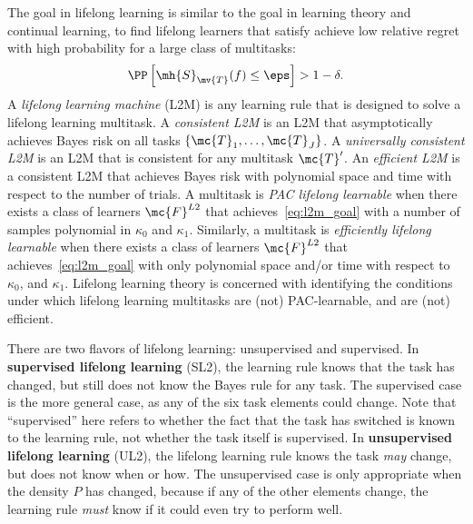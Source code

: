 \documentclass{article}
\begin{document}
The goal in lifelong learning is similar to the goal in learning theory and continual learning, to find lifelong learners that satisfy achieve low relative regret with high probability for a large class of multitasks:
\begin{align} \label{eq:l2m_goal}
    \PP\left[\mh{S}_{\mv{T}}(f)  \leq \eps \right] > 1 - \delta.
\end{align}
A \emph{lifelong learning machine} (L2M) is any learning rule that is designed to solve a lifelong learning multitask. A \emph{consistent L2M} is an L2M that asymptotically achieves Bayes risk on all tasks $\{\mc{T}_1,\ldots, \mc{T}_J\}$.  
A \emph{universally consistent L2M} is an L2M that is consistent for any multitask $\mc{T}'$.  
An \emph{efficient L2M}  is a consistent L2M that achieves Bayes risk with polynomial space and time with respect to the number of trials. 
A multitask is \emph{PAC lifelong learnable} when there exists a class of learners $\mc{F}^{L2}$ that achieves~\eqref{eq:l2m_goal} with a number of samples polynomial in $\kappa_0$ and $\kappa_1$.  Similarly, a multitask is \emph{efficiently lifelong learnable} when there exists a class of learners $\mc{F}^{L2}$ that achieves~\eqref{eq:l2m_goal} with only polynomial space and/or time with respect to $\kappa_0$, and $ \kappa_1$.
{Lifelong learning theory is concerned with identifying the conditions under which lifelong learning multitasks are (not) PAC-learnable, and are (not) efficient.}




There are two flavors of lifelong learning: unsupervised and supervised. 
In \textbf{supervised lifelong learning} (SL2), the learning rule knows that the task has changed, but still does not know  the Bayes rule for any task.  The supervised case is the more general case, as any of the six task elements could change. Note that ``supervised'' here refers to whether the fact that the task has switched is known to the learning rule, not whether the task itself is supervised.  
% 
In \textbf{unsupervised lifelong learning} (UL2), the lifelong learning rule knows the task \emph{may} change, but does not know when or how. The unsupervised case is only appropriate when the density $P$ has changed, because if any of the other elements change, the learning rule \emph{must} know if it could even try to perform well. 
\end{document}
